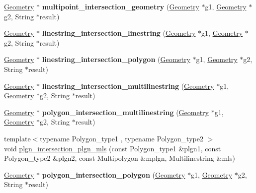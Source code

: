 \begin{DoxyCompactItemize}
\mbox{\hyperlink{classGeometry}{Geometry}} $\ast$ {\bfseries multipoint\+\_\+intersection\+\_\+geometry} (\mbox{\hyperlink{classGeometry}{Geometry}} $\ast$g1, \mbox{\hyperlink{classGeometry}{Geometry}} $\ast$g2, String $\ast$result)
\item 
\mbox{\label{classBG__setop__wrapper_a94202367804802795fc59b6d15ace192}} 
\mbox{\hyperlink{classGeometry}{Geometry}} $\ast$ {\bfseries linestring\+\_\+intersection\+\_\+linestring} (\mbox{\hyperlink{classGeometry}{Geometry}} $\ast$g1, \mbox{\hyperlink{classGeometry}{Geometry}} $\ast$g2, String $\ast$result)
\item 
\mbox{\label{classBG__setop__wrapper_ab556784a7b6bacc88548160c132695d6}} 
\mbox{\hyperlink{classGeometry}{Geometry}} $\ast$ {\bfseries linestring\+\_\+intersection\+\_\+polygon} (\mbox{\hyperlink{classGeometry}{Geometry}} $\ast$g1, \mbox{\hyperlink{classGeometry}{Geometry}} $\ast$g2, String $\ast$result)
\item 
\mbox{\label{classBG__setop__wrapper_a45908b835793628d6b34767925951991}} 
\mbox{\hyperlink{classGeometry}{Geometry}} $\ast$ {\bfseries linestring\+\_\+intersection\+\_\+multilinestring} (\mbox{\hyperlink{classGeometry}{Geometry}} $\ast$g1, \mbox{\hyperlink{classGeometry}{Geometry}} $\ast$g2, String $\ast$result)
\item 
\mbox{\label{classBG__setop__wrapper_ad96fbf966907be3294210b72d3f7696c}} 
\mbox{\hyperlink{classGeometry}{Geometry}} $\ast$ {\bfseries polygon\+\_\+intersection\+\_\+multilinestring} (\mbox{\hyperlink{classGeometry}{Geometry}} $\ast$g1, \mbox{\hyperlink{classGeometry}{Geometry}} $\ast$g2, String $\ast$result)
\item 
{\footnotesize template$<$typename Polygon\+\_\+type1 , typename Polygon\+\_\+type2 $>$ }\\void \mbox{\hyperlink{classBG__setop__wrapper_a489e69e0e979f5ffc27d6989cc73d3a3}{plgn\+\_\+intersection\+\_\+plgn\+\_\+mls}} (const Polygon\+\_\+type1 \&plgn1, const Polygon\+\_\+type2 \&plgn2, const Multipolygon \&mplgn, Multilinestring \&mls)
\item 
\mbox{\label{classBG__setop__wrapper_a32070c53ffefb82255107ce13e1c783a}} 
\mbox{\hyperlink{classGeometry}{Geometry}} $\ast$ {\bfseries polygon\+\_\+intersection\+\_\+polygon} (\mbox{\hyperlink{classGeometry}{Geometry}} $\ast$g1, \mbox{\hyperlink{classGeometry}{Geometry}} $\ast$g2, String $\ast$result)

\end{DoxyCompactItemize}
